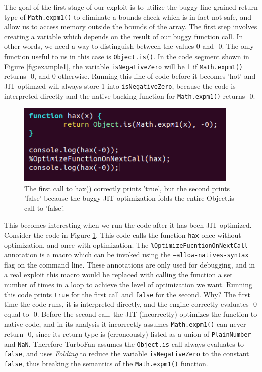 \documentclass[11pt]{article}
\begin{document}
The goal of the first stage of our exploit is to utilize the buggy fine-grained return type of
\texttt{Math.expm1()} to eliminate a bounds check which is in fact not safe, and allow us to access
memory outside the bounds of the array. The first step involves creating a variable which depends on
the result of our buggy function call. In other words, we need a way to distinguish between the
values 0 and -0. The only function useful to us in this case is \texttt{Object.is()}. In the code
segment shown in Figure \ref{fig:example1}, the variable \texttt{isNegativeZero} will be 1 if
\texttt{Math.expm1()} returns -0, and 0 otherwise. Running this line of code before it becomes 'hot'
and JIT optimzed will always store 1 into \texttt{isNegativeZero}, because the code is interpreted
directly and the native backing function for \texttt{Math.expm1()} returns -0. 

\begin{figure}
	\centering
	\includegraphics[width=300pt]{example2.png}
	\caption{The first call to hax() correctly prints 'true', but the second prints 'false' because the buggy JIT optimization folds the entire Object.is call to 'false'.}
  \label{fig:example2}
\end{figure}

This becomes interesting when we run the code after it has been JIT-optimized. Consider the code in
Figure \ref{fig:example2}. This code calls the function \texttt{hax} once without optimization, and
once with optimization. The \texttt{\%OptimizeFucntionOnNextCall} annotation is a macro which
can be invoked using the \texttt{--allow-natives-syntax} flag on the command line. These annotations
are only used for debugging, and in a real exploit this macro would be replaced with calling the
function a set number of times in a loop to achieve the level of optimization we want. Running this code prints \texttt{true} for the first call and \texttt{false}
for the second. Why? The first time the code runs, it is interpreted directly, and the engine
correctly evaluates -0 equal to -0. Before the second call, the JIT (incorrectly) optimizes the
function to native code, and in its analysis it incorrectly assumes \texttt{Math.expm1()} can never
return -0, since its return type is (erroneously) listed as a union of \texttt{PlainNumber} and
\texttt{NaN}. Therefore TurboFan assumes the \texttt{Object.is} call always evaluates to
\texttt{false}, and uses \textit{Folding} to reduce the variable \texttt{isNegativeZero} to the
constant \texttt{false}, thus breaking the semantics of the \texttt{Math.expm1()} function.
\end{document}
